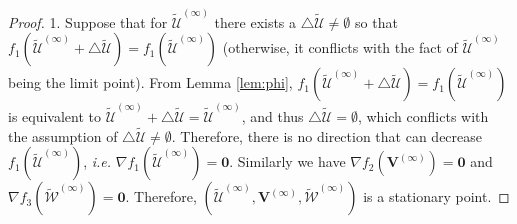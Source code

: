 \documentclass{article}
\def\ie{\emph{i.e. }}
\begin{document}
\begin{proof}

1. Suppose that for $\tilde{\mathcal{U}}^{(\infty)}$ there exists a $\triangle\tilde{\mathcal{U}}\neq \emptyset$ so that $f_1(\tilde{\mathcal{U}}^{(\infty)}+\triangle\tilde{\mathcal{U}}) = f_1(\tilde{\mathcal{U}}^{(\infty)})$ (otherwise, it conflicts with the fact of $\tilde{\mathcal{U}}^{(\infty)}$ being the limit point). From Lemma \ref{lem:phi}, $f_1(\tilde{\mathcal{U}}^{(\infty)}+\triangle\tilde{\mathcal{U}}) = f_1(\tilde{\mathcal{U}}^{(\infty)})$ is equivalent to $\tilde{\mathcal{U}}^{(\infty)}+\triangle\tilde{\mathcal{U}} = \tilde{\mathcal{U}}^{(\infty)}$, and thus $\triangle\tilde{\mathcal{U}}=\emptyset$, which conflicts with the assumption of $\triangle\tilde{\mathcal{U}}\neq \emptyset$. Therefore, there is no direction that can decrease $f_1(\tilde{\mathcal{U}}^{(\infty)})$, \ie $\nabla f_1(\tilde{\mathcal{U}}^{(\infty)})=\mathbf{0}$. Similarly we have $\nabla f_2(\mathbf{V}^{(\infty)})=\mathbf{0}$ and $\nabla f_3(\tilde{\mathcal{W}}^{(\infty)})=\mathbf{0}$. Therefore, $\left(\tilde{\mathcal{U}}^{(\infty)}, \mathbf{V}^{(\infty)}, \tilde{\mathcal{W}}^{(\infty)}\right)$ is a stationary point.


\end{proof}
\end{document}

